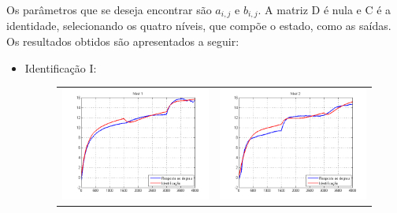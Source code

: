Os parâmetros que se deseja encontrar são $a_{i,j}$ e $b_{i,j}$. A matriz D é nula e C é a identidade, selecionando os quatro níveis, que compõe o estado, como as saídas. Os resultados obtidos são apresentados a seguir:

\begin{itemize}
\newpage \item  Identificação I:

\begin{figure}[H]
	\centering
	\begin{tabular}{cc}
		\includegraphics[height=0.15\paperheight,keepaspectratio]{img/ident1_h1.png} &
		\includegraphics[height=0.15\paperheight,keepaspectratio]{img/ident1_h2.png} \\

\end{tabular}
\end{figure}
\end{itemize}
